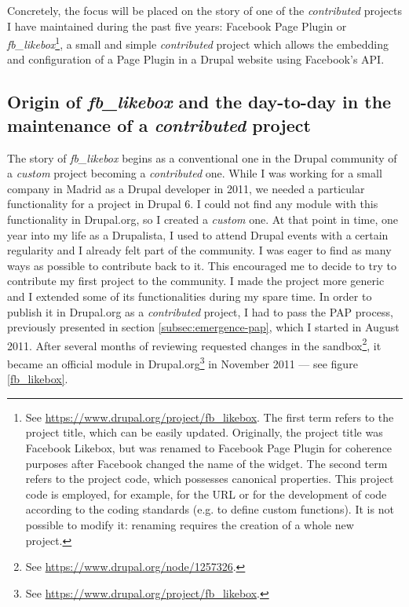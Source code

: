 Concretely, the focus will be placed on the story of one of the \textit{contributed} projects I have maintained during the past five years: Facebook Page Plugin or \textit{fb\_likebox}\footnote{See \url{https://www.drupal.org/project/fb_likebox}. The first term refers to the project title, which can be easily updated. Originally, the project title was Facebook Likebox, but was renamed to Facebook Page Plugin for coherence purposes after Facebook changed the name of the widget. The second term refers to the project code, which possesses canonical properties. This project code is employed, for example, for the URL or for the development of code according to the coding standards (e.g. to define custom functions). It is not possible to modify it: renaming requires the creation of a whole new project.}, a small and simple \textit{contributed} project which allows the embedding and configuration of a Page Plugin in a Drupal website using Facebook's API.

\subsection{Origin of \textit{fb\_likebox} and the day-to-day in the maintenance of a \textit{contributed} project}

The story of \textit{fb\_likebox} begins as a conventional one in the Drupal community of a \textit{custom} project becoming a \textit{contributed} one. While I was working for a small company in Madrid as a Drupal developer in 2011, we needed a particular functionality for a project in Drupal 6. I could not find any module with this functionality in Drupal.org, so I created a \textit{custom} one. At that point in time, one year into my life as a Drupalista, I used to attend Drupal events with a certain regularity and I already felt part of the community. I was eager to find as many ways as possible to contribute back to it. This encouraged me to decide to try to contribute my first project to the community. I made the project more generic and I extended some of its functionalities during my spare time. In order to publish it in Drupal.org as a \textit{contributed} project, I had to pass the PAP process, previously presented in section \ref{subsec:emergence-pap}, which I started in August 2011. After several months of reviewing requested changes in the sandbox\footnote{See \url{https://www.drupal.org/node/1257326}.}, it became an official module in Drupal.org\footnote{See \url{https://www.drupal.org/project/fb_likebox}.} in November 2011 --- see figure \ref{fb_likebox}.

